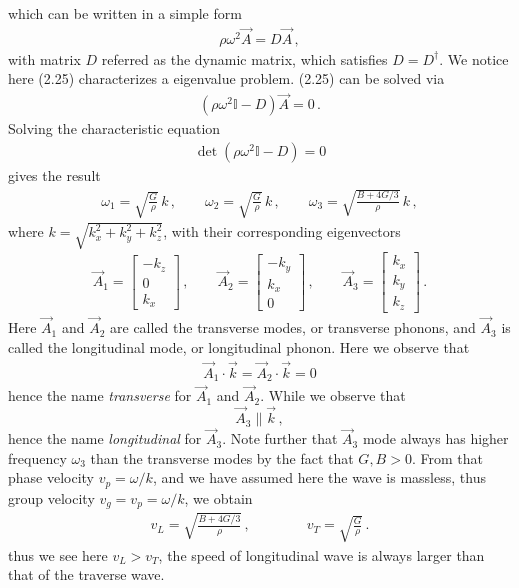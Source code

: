 \documentclass[11pt, onesided]{book}
\theoremstyle{break}
\theoremstyle{break}
\newcommand{\bmat}[1]{\begin{bmatrix} #1 \end{bmatrix}}
\begin{document}
which can be written in a simple form
\begin{align}
\rho \omega^2 \vec{A} = D\vec{A}\,,
\end{align}
with matrix $D$ referred as the dynamic matrix, which satisfies $D = D^\dagger$. We notice here (2.25) characterizes a eigenvalue problem. (2.25) can be solved via
\begin{align*}
\left( \rho \omega^2 \mathbb{I} - D\right) \vec{A} = 0\,.
\end{align*}
Solving the characteristic equation
\begin{align*}
\det(\rho \omega^2 \mathbb{I} - D) = 0
\end{align*}
gives the result 
\begin{align*}
\omega_1 = \sqrt{\frac{G}{\rho}}\, k\,,\qquad
\omega_2 = \sqrt{\frac{G}{\rho}}\, k\,,\qquad
\omega_3 = \sqrt{\frac{B+4G/3}{\rho}}\, k\,,
\end{align*}
where $k = \sqrt{k_x^2 + k_y^2 + k_z^2}$, with their corresponding eigenvectors
\begin{align*}
\vec{A}_1 = \bmat{-k_z \\ 0 \\ k_x} \,,\qquad
\vec{A}_2 = \bmat{-k_y \\ k_x \\0}\,,\qquad
\vec{A}_3 = \bmat{k_x \\ k_y \\ k_z}\,.
\end{align*}
Here $\vec{A}_1$ and $\vec{A}_2$ are called the transverse modes, or transverse phonons, and $\vec{A}_3$ is called the longitudinal mode, or longitudinal phonon. Here we observe that
\begin{align*}
\vec{A}_1 \cdot \vec{k} = \vec{A}_2 \cdot \vec{k} = 0
\end{align*}
hence the name \textit{transverse} for $\vec{A}_1$ and $\vec{A}_2$. While we observe that $$\vec{A}_3 \parallel \vec{k}\,,$$  
hence the name \textit{longitudinal} for $\vec{A}_3$. Note further that $\vec{A}_3$ mode always has higher frequency $\omega_3$ than the transverse modes by the fact that $G,B >0$. From that phase velocity $v_p = \omega/k$, and we have assumed here the wave is massless, thus group velocity $v_g = v_p = \omega/k$, we obtain
\begin{align*}
v_L = \sqrt{\frac{B+4G/3}{\rho}}\,,\qquad\qquad v_T=\sqrt{\frac{G}{\rho}}\,.
\end{align*}
thus we see here $v_L > v_T$, the speed of longitudinal wave is always larger than that of the traverse wave. \\
\end{document}
